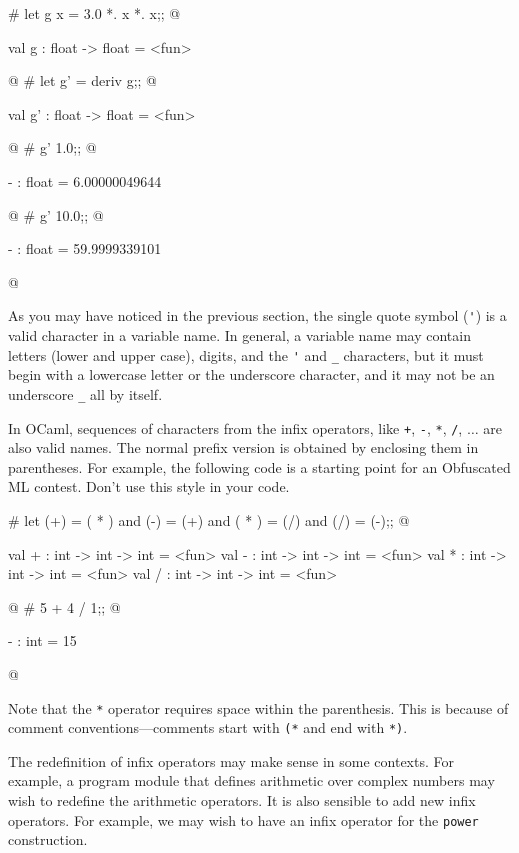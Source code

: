 \begin{ocaml}
# let g x = 3.0 *. x *. x;;
@
\begin{topoutput}
val g : float -> float = <fun>
\end{topoutput}
@
# let g' = deriv g;;
@
\begin{topoutput}
val g' : float -> float = <fun>
\end{topoutput}
@
# g' 1.0;;
@
\begin{topoutput}
- : float = 6.00000049644
\end{topoutput}
@
# g' 10.0;;
@
\begin{topoutput}
- : float = 59.9999339101
\end{topoutput}
@
\end{ocaml}


As you may have noticed in the previous section, the single quote symbol (\hbox{\lstinline/'/})
is a valid character in a variable name.  In general, a variable name
may contain letters (lower and upper case), digits, and the \hbox{\lstinline/'/} and
\hbox{\lstinline/_/} characters, but it must begin with a lowercase letter or
the underscore character, and it may not be an underscore \hbox{\lstinline/_/} all by itself.

\label{name:value-name}
In OCaml, sequences of characters from the infix operators, like
\lstinline$+$, \hbox{\lstinline/-/}, \hbox{\lstinline/*/}, \lstinline!/!, $\ldots$
are also valid names.  The normal prefix version is obtained by
enclosing them in parentheses.  For example, the following code is a
starting point for an Obfuscated ML contest.  Don't use this style in
your code.

\begin{ocaml}
# let (+) = ( * )
  and (-) = (+)
  and ( * ) = (/)
  and (/) = (-);;
@
\begin{topoutput}
val + : int -> int -> int = <fun>
val - : int -> int -> int = <fun>
val * : int -> int -> int = <fun>
val / : int -> int -> int = <fun>
\end{topoutput}
@
# 5 + 4 / 1;;
@
\begin{topoutput}
- : int = 15
\end{topoutput}
@
\end{ocaml}
%
Note that the \hbox{\lstinline/*/} operator requires space within the parenthesis.
This is because of comment conventions---comments start with
\verb/(*/ and end with \verb/*)/.

The redefinition of infix operators may make sense in some contexts.
For example, a program module that defines arithmetic over complex
numbers may wish to redefine the arithmetic operators.  It is also
sensible to add new infix operators.  For example, we may wish to have
an infix operator for the \texttt{power} construction.


